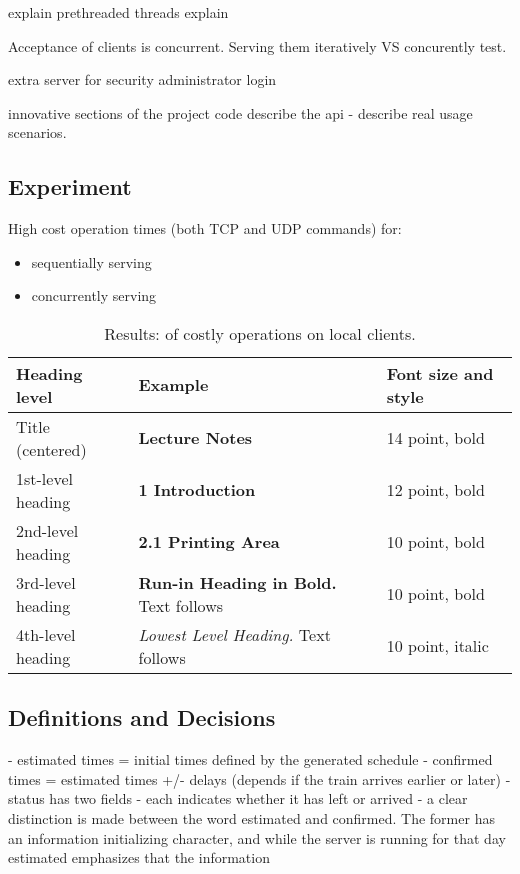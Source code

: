 \documentclass[runningheads]{llncs}
\begin{document}
explain prethreaded threads
explain 

Acceptance of clients is concurrent. Serving them iteratively VS concurently test.

extra server for security
administrator login

innovative sections of the project code 
describe the api - describe real usage scenarios.

\subsection{Experiment}

High cost operation times (both TCP and UDP commands) for:
\begin{itemize}
    \item sequentially serving
    \item concurrently serving
\end{itemize}

\begin{table}
    \caption{Results: of costly operations on local clients.}\label{tab1}
    \begin{tabular}{|l|l|l|}
    \hline
    Heading level &  Example & Font size and style\\
    \hline
    Title (centered) &  {\Large\bfseries Lecture Notes} & 14 point, bold\\
    1st-level heading &  {\large\bfseries 1 Introduction} & 12 point, bold\\
    2nd-level heading & {\bfseries 2.1 Printing Area} & 10 point, bold\\
    3rd-level heading & {\bfseries Run-in Heading in Bold.} Text follows & 10 point, bold\\
    4th-level heading & {\itshape Lowest Level Heading.} Text follows & 10 point, italic\\
    \hline
    \end{tabular}
    \end{table}
    

\subsection{Definitions and Decisions}



- estimated times = initial times defined by the generated schedule
- confirmed times = estimated times +/- delays (depends if the train arrives earlier or later)
- status has two fields - each indicates whether it has left or arrived
- a clear distinction is made between the word estimated and confirmed. The former has an information initializing character, and while the server is running for that day estimated emphasizes that the information
\end{document}
